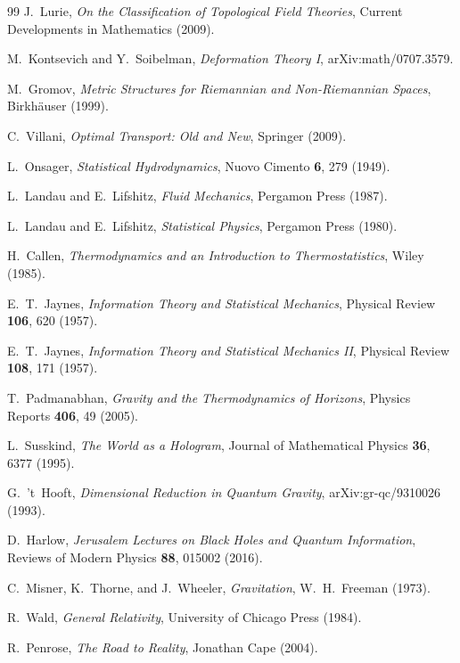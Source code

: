 \documentclass[12pt,a4paper]{article}
\theoremstyle{plain}
\theoremstyle{definition}
\theoremstyle{remark}
\begin{document}
\begin{thebibliography}{99}
J.~Lurie,
\emph{On the Classification of Topological Field Theories},
Current Developments in Mathematics (2009).

M.~Kontsevich and Y.~Soibelman,
\emph{Deformation Theory I},
arXiv:math/0707.3579.

M.~Gromov,
\emph{Metric Structures for Riemannian and Non-Riemannian Spaces},
Birkh\"{a}user (1999).

C.~Villani,
\emph{Optimal Transport: Old and New},
Springer (2009).

L.~Onsager,
\emph{Statistical Hydrodynamics},
Nuovo Cimento \textbf{6}, 279 (1949).

L.~Landau and E.~Lifshitz,
\emph{Fluid Mechanics},
Pergamon Press (1987).

L.~Landau and E.~Lifshitz,
\emph{Statistical Physics},
Pergamon Press (1980).

H.~Callen,
\emph{Thermodynamics and an Introduction to Thermostatistics},
Wiley (1985).

E.~T.~Jaynes,
\emph{Information Theory and Statistical Mechanics},
Physical Review \textbf{106}, 620 (1957).

E.~T.~Jaynes,
\emph{Information Theory and Statistical Mechanics II},
Physical Review \textbf{108}, 171 (1957).

T.~Padmanabhan,
\emph{Gravity and the Thermodynamics of Horizons},
Physics Reports \textbf{406}, 49 (2005).

L.~Susskind,
\emph{The World as a Hologram},
Journal of Mathematical Physics \textbf{36}, 6377 (1995).

G.~'t~Hooft,
\emph{Dimensional Reduction in Quantum Gravity},
arXiv:gr-qc/9310026 (1993).

D.~Harlow,
\emph{Jerusalem Lectures on Black Holes and Quantum Information},
Reviews of Modern Physics \textbf{88}, 015002 (2016).

C.~Misner, K.~Thorne, and J.~Wheeler,
\emph{Gravitation},
W.~H.~Freeman (1973).

R.~Wald,
\emph{General Relativity},
University of Chicago Press (1984).

R.~Penrose,
\emph{The Road to Reality},
Jonathan Cape (2004).


\end{thebibliography}
\end{document}
